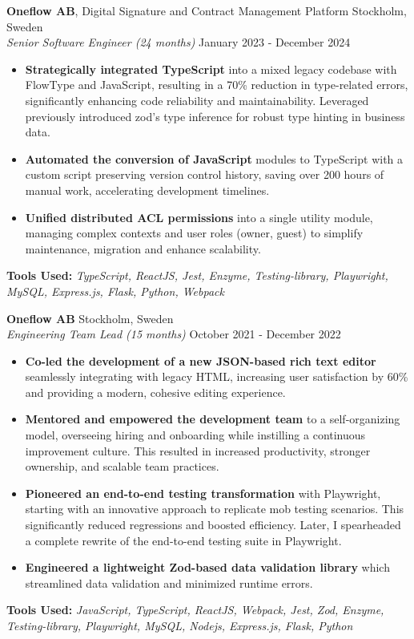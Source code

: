 \begin{minipage}[t]{0.61\textwidth}
\Large
\noindent
\textbf{\Large Oneflow AB}, Digital Signature and Contract Management Platform \hfill Stockholm, Sweden\\ %
\textit{Senior Software Engineer (24 months)} \hfill January 2023 - December 2024 %
\begin{itemize}
\setlength{\itemsep}{0.5em}
    \item \textbf{Strategically integrated TypeScript} into a mixed legacy codebase with FlowType and JavaScript, resulting in a 70\% reduction in type-related errors, significantly enhancing code reliability and maintainability.
    Leveraged previously introduced zod's type inference for robust type hinting in business data.
    \item \textbf{Automated the conversion of JavaScript} modules to TypeScript with a custom script preserving version control history, saving over 200 hours of manual work, accelerating development timelines.
    \item \textbf{Unified distributed ACL permissions} into a single utility module, managing complex contexts and user roles (owner, guest) to simplify maintenance, migration and enhance scalability.
\end{itemize}
\vspace{1em}
\textbf{Tools Used:} \textit{TypeScript, ReactJS, Jest, Enzyme, Testing-library, Playwright, MySQL, Express.js, Flask, Python, Webpack}

\vspace{1.5em}

\noindent
\textbf{Oneflow AB} \hfill Stockholm, Sweden\\
\textit{Engineering Team Lead (15 months)} \hfill October 2021 - December 2022 %
\begin{itemize}
\setlength{\itemsep}{0.5em}
    \item \textbf{Co-led the development of a new JSON-based rich text editor} seamlessly integrating with legacy HTML, increasing user satisfaction by 60\% and providing a modern, cohesive editing experience.
    \item \textbf{Mentored and empowered the development team} to a self-organizing model, overseeing hiring and onboarding while instilling a continuous improvement culture. This resulted in increased productivity, stronger ownership, and scalable team practices.
    \item \textbf{Pioneered an end-to-end testing transformation} with Playwright, starting with an innovative approach to replicate mob testing scenarios. This significantly reduced regressions and boosted efficiency.
    Later, I spearheaded a complete rewrite of the end-to-end testing suite in Playwright.
    \item \textbf{Engineered a lightweight Zod-based data validation library} which streamlined data validation and minimized runtime errors.
\end{itemize}

\vspace{1em}

\textbf{Tools Used:} \textit{JavaScript, TypeScript, ReactJS, Webpack, Jest, Zod, Enzyme, Testing-library, Playwright, MySQL, Nodejs, Express.js, Flask, Python}

\end{minipage}
